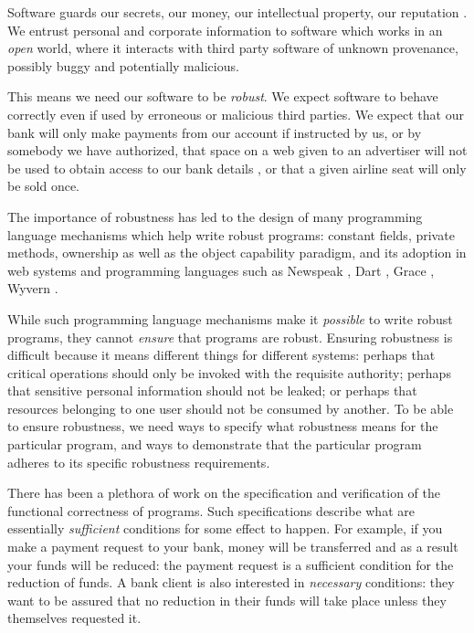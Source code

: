 Software guards our secrets, our money, our intellectual property,
our reputation \cite{covern}.  We entrust personal and
corporate information to software which works in an \emph{open} world, 
where  it interacts with %
third party software of unknown provenance, possibly buggy and potentially malicious.

This means we need our software to be \emph{robust}.
We expect software to behave correctly even if  used 
by erroneous or malicious third parties.
 We expect that our bank will only make payments 
from our account if instructed by us, or by somebody we have authorized, 
that space on a web given to an advertiser will not be used
to obtain access to our bank details \cite{cwe}, or that a given
airline seat will only be sold once. 

The importance of robustness has led to the design of many programming
language mechanisms which help write robust programs:
constant fields, private methods, ownership\cite{ownalias}
as well as the object capability paradigm\cite{MillerPhD},
and its adoption in  web systems
\cite{CapJavaHayesAPLAS17,CapNetSocc17Eide,DOCaT14} and programming languages such as Newspeak
\cite{newspeak17}, Dart \cite{dart15}, Grace \cite{grace,graceClasses}, Wyvern \cite{wyverncapabilities}.

While such programming language mechanisms make it \textit{possible} to write robust
programs, they cannot \textit{ensure} that programs are robust.
Ensuring robustness is difficult because it means 
different things for different systems: perhaps
that critical operations should only be invoked with the requisite authority;
perhaps that sensitive personal information should not be leaked; 
or perhaps that resources belonging to one user should not be consumed by another.
%
To be able to ensure robustness, we need ways to specify what robustness means for the 
particular program, and ways to demonstrate that the particular program 
adheres to its specific robustness requirements.

There has been a plethora of work on the specification and verification of the
functional correctness of programs. Such specifications describe what are
essentially \emph{sufficient} conditions for some
effect to happen. For example, if you make a payment request to your bank, money will be transferred
and as a result your funds will be reduced: the payment request is a sufficient condition for the
reduction of funds. A bank client is also interested in \emph{necessary} conditions:
they want to be assured that no reduction in their funds will take place unless they themselves
requested it.

